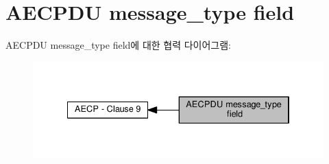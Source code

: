 \hypertarget{group__aecp__message__type}{}\section{A\+E\+C\+P\+DU message\+\_\+type field}
\label{group__aecp__message__type}
A\+E\+C\+P\+DU message\+\_\+type field에 대한 협력 다이어그램\+:
\nopagebreak
\begin{figure}[H]
\begin{center}
\leavevmode
\includegraphics[width=334pt]{group__aecp__message__type}
\end{center}
\end{figure}

